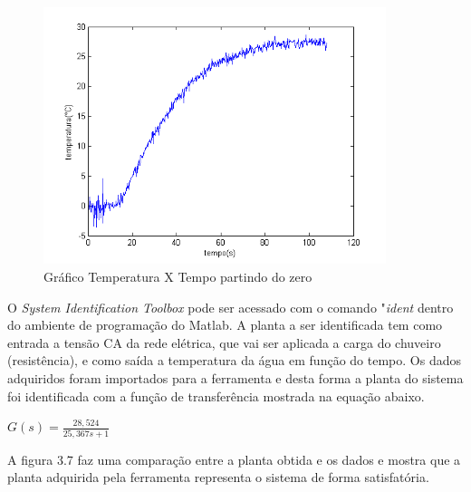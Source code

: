 \begin{figure}[H]

\center

\includegraphics[width=10cm]{imagens/temperatura_tempo_ident.png}

\label{Gráfico Temperatura X Tempo partindo do zero}

\caption{Gráfico Temperatura X Tempo partindo do zero}

\end{figure}

O \textit{System Identification Toolbox} pode ser acessado com o comando "\textit{ident} dentro do ambiente de programação do Matlab. A planta a ser identificada tem como entrada a tensão CA da rede elétrica, que vai ser aplicada a carga do chuveiro (resistência), e como saída a temperatura da água em função do tempo. Os dados adquiridos foram importados para a ferramenta e desta forma a planta do sistema foi identificada com a função de transferência mostrada na equação abaixo.

\begin{center}
$G(s) = \frac{28,524}{25,367s + 1}$

\end{center}

A figura 3.7 faz uma comparação entre a planta obtida e os dados e mostra que a planta adquirida pela ferramenta representa o sistema de forma satisfatória.

